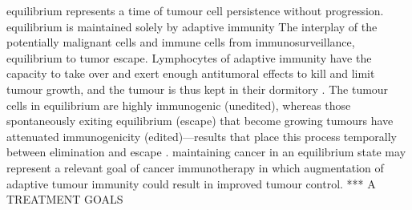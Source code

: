 \documentclass[12pt, a4paper]{article}
\begin{document}
equilibrium represents a time of tumour cell persistence without progression.
equilibrium is maintained solely by adaptive immunity
The interplay of the potentially malignant cells and immune cells from immunosurveillance, equilibrium to tumor escape.
Lymphocytes of adaptive immunity have the capacity to take over and exert enough antitumoral effects to kill and limit tumour growth, and the tumour is thus kept in their dormitory \citep{Koebel2007}.
The tumour cells in equilibrium are highly immunogenic (unedited), whereas those spontaneously exiting equilibrium (escape) that become growing tumours have attenuated immunogenicity (edited)—results that place this process temporally between elimination and escape \citep{Koebel2007}.
maintaining cancer in an equilibrium state may represent a relevant goal of cancer immunotherapy in which augmentation of adaptive tumour immunity could result in improved tumour control. *** A TREATMENT GOALS
\end{document}
